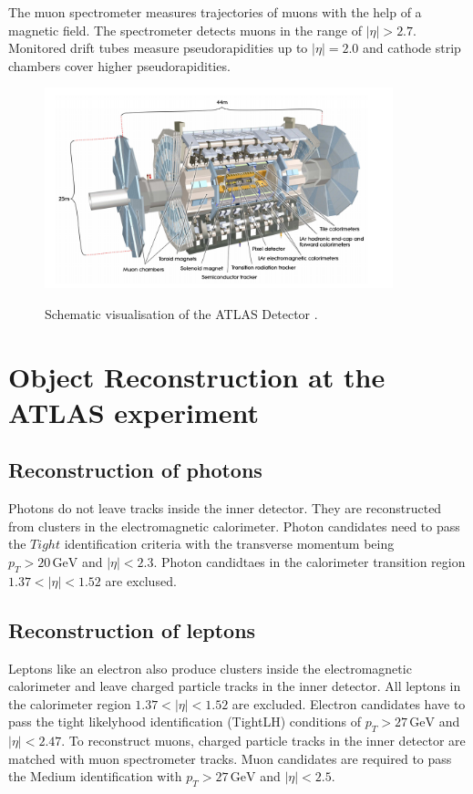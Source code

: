 The muon spectrometer measures trajectories of muons with the help of a magnetic field. The spectrometer detects muons in the range of $\bigl|\eta\bigr| > 2.7$. 
Monitored drift tubes measure pseudorapidities up to $|\eta| = 2.0$ and cathode strip chambers cover higher pseudorapidities.  
\begin{figure}
    \centering
    \includegraphics[width=0.9\textwidth]{Plots/atlasSCHEMA.PNG}
    \label{fig:atlasschema}
    \caption{Schematic visualisation of the ATLAS Detector \cite{Collaboration_2008}.}
\end{figure}



\section{Object Reconstruction at the ATLAS experiment}
\label{sec:reconstruction}
\subsection{Reconstruction of photons}
\label{sec:reconphoton}

Photons do not leave tracks inside the inner detector. They are reconstructed from clusters in the electromagnetic calorimeter. Photon candidates need to pass the $Tight$ identification criteria with the transverse momentum being $p_T >20\,\si{\giga\electronvolt}$ and $|\eta| < 2.3$. 
Photon candidtaes in the calorimeter transition region $1.37 < |\eta| < 1.52$ are exclused. 

\subsection{Reconstruction of leptons}
\label{sec:reconlepton}

Leptons like an electron also produce clusters inside the electromagnetic calorimeter and leave charged particle tracks in the inner detector. All leptons in the calorimeter region $1.37 < |\eta| < 1.52$ are excluded. Electron candidates have to pass the tight likelyhood identification (TightLH) conditions of $p_T > 27 \,\si{\giga\electronvolt}$ and $|\eta| < 2.47$. 
To reconstruct muons, charged particle tracks in the inner detector are matched with muon spectrometer tracks. Muon candidates are required to pass the Medium identification with $p_T > 27 \,\si{\giga\electronvolt}$ and $|\eta| < 2.5$.

